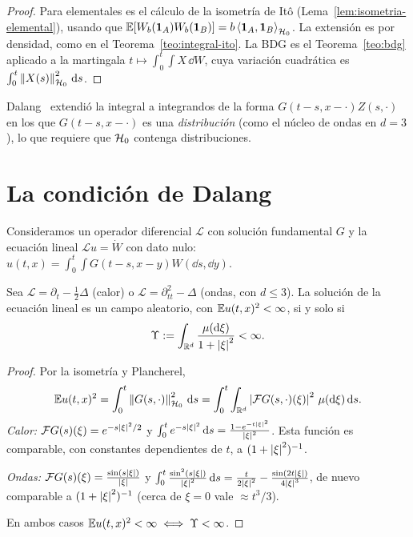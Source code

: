 \begin{proof}
Para elementales es el cálculo de la isometría de Itô (Lema~\ref{lem:isometria-elemental}), usando que
$\mathbb{E}[W_b(\mathbf{1}_A)W_b(\mathbf{1}_B)]=b\left\langle \mathbf{1}_A, \mathbf{1}_B\right\rangle_{\mathcal{H}_0}$. La extensión es por densidad, como en el Teorema~\ref{teo:integral-ito}. La
BDG es el Teorema~\ref{teo:bdg} aplicado a la martingala $t\mapsto\int_0^t\int X\,\dd W$, cuya variación cuadrática es
$\int_0^t\left\lVert X(s)\right\rVert^2_{\mathcal{H}_0}\,\mathrm{d} s$.
\end{proof}

Dalang~\cite{Dalang99} extendió la integral a integrandos de la forma $G(t-s,x-\cdot)Z(s,\cdot)$ en los que
$G(t-s,x-\cdot)$ es una \emph{distribución} (como el núcleo de ondas en $d=3$), lo que requiere que $\mathcal{H}_0$
contenga distribuciones.

\section{La condición de Dalang}
Consideramos un operador diferencial $\mathcal L$ con solución fundamental $G$ y la ecuación lineal $\mathcal Lu=\dot W$
con dato nulo: $u(t,x)=\int_0^t\int G(t-s,x-y)W(\dd s,\dd y)$.

\begin{teorema}[Dalang, 1999]\label{teo:dalang}
Sea $\mathcal L=\partial_t-\frac12\Delta$ (calor) o $\mathcal L=\partial^2_{tt}-\Delta$ (ondas, con $d\le3$).
La solución de la ecuación lineal es un campo aleatorio, con $\mathbb{E} u(t,x)^2<\infty$, si y solo si
\begin{equation}\label{eq:dalang}
  \Upsilon:=\int_{\mathbb{R}^d}\frac{\mu(\mathrm{d}\xi)}{1+\left\lvert \xi\right\rvert^2}<\infty.
\end{equation}
\end{teorema}

\begin{proof}
Por la isometría y Plancherel,
\[
  \mathbb{E} u(t,x)^2=\int_0^t\left\lVert G(s,\cdot)\right\rVert^2_{\mathcal{H}_0}\,\mathrm{d} s=\int_0^t\int_{\mathbb{R}^d}\left\lvert \mathcal FG(s,\cdot)(\xi)\right\rvert^2\,\mu(\mathrm{d}\xi)\,\mathrm{d} s.
\]
\emph{Calor:} $\mathcal FG(s)(\xi)=e^{-s\left\lvert \xi\right\rvert^2/2}$ y $\int_0^te^{-s\left\lvert \xi\right\rvert^2}\,\mathrm{d} s=\frac{1-e^{-t\left\lvert \xi\right\rvert^2}}{\left\lvert \xi\right\rvert^2}$. Esta función es comparable, con
constantes dependientes de $t$, a $(1+\left\lvert \xi\right\rvert^2)^{-1}$.

\emph{Ondas:} $\mathcal FG(s)(\xi)=\frac{\sin(s\left\lvert \xi\right\rvert)}{\left\lvert \xi\right\rvert}$ y $\int_0^t\frac{\sin^2(s\left\lvert \xi\right\rvert)}{\left\lvert \xi\right\rvert^2}\,\mathrm{d} s=\frac{t}{2\left\lvert \xi\right\rvert^2}-\frac{\sin(2t\left\lvert \xi\right\rvert)}{4\left\lvert \xi\right\rvert^3}$, de nuevo comparable a
$(1+\left\lvert \xi\right\rvert^2)^{-1}$ (cerca de $\xi=0$ vale $\approx t^3/3$).

En ambos casos $\mathbb{E} u(t,x)^2<\infty\iff\Upsilon<\infty$.
\end{proof}

